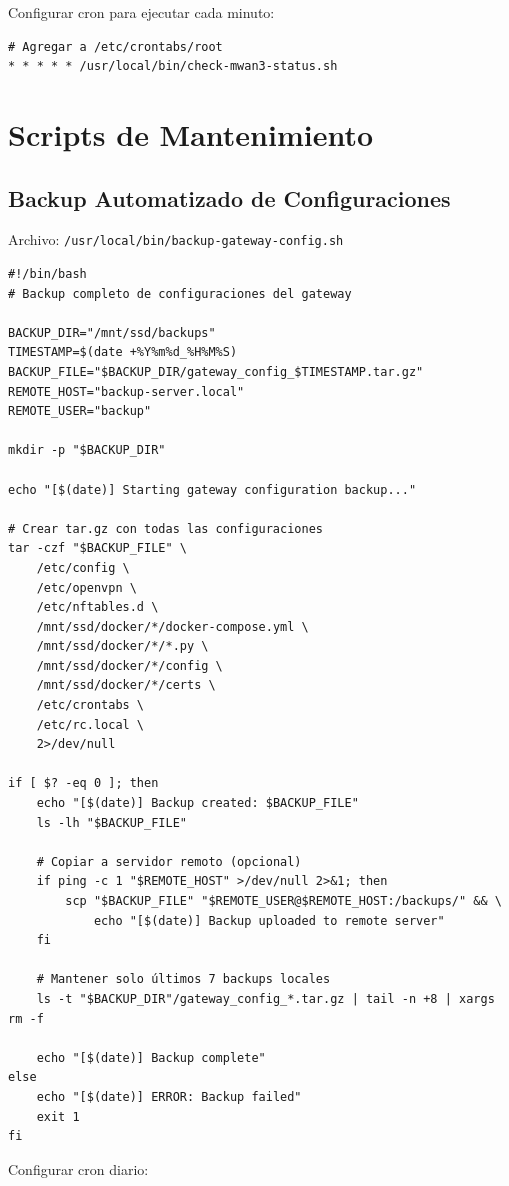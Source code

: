 Configurar cron para ejecutar cada minuto:

\begin{verbatim}
# Agregar a /etc/crontabs/root
* * * * * /usr/local/bin/check-mwan3-status.sh
\end{verbatim}

\section{Scripts de Mantenimiento}

\subsection{Backup Automatizado de Configuraciones}

Archivo: \texttt{/usr/local/bin/backup-gateway-config.sh}

\begin{verbatim}
#!/bin/bash
# Backup completo de configuraciones del gateway

BACKUP_DIR="/mnt/ssd/backups"
TIMESTAMP=$(date +%Y%m%d_%H%M%S)
BACKUP_FILE="$BACKUP_DIR/gateway_config_$TIMESTAMP.tar.gz"
REMOTE_HOST="backup-server.local"
REMOTE_USER="backup"

mkdir -p "$BACKUP_DIR"

echo "[$(date)] Starting gateway configuration backup..."

# Crear tar.gz con todas las configuraciones
tar -czf "$BACKUP_FILE" \
    /etc/config \
    /etc/openvpn \
    /etc/nftables.d \
    /mnt/ssd/docker/*/docker-compose.yml \
    /mnt/ssd/docker/*/*.py \
    /mnt/ssd/docker/*/config \
    /mnt/ssd/docker/*/certs \
    /etc/crontabs \
    /etc/rc.local \
    2>/dev/null

if [ $? -eq 0 ]; then
    echo "[$(date)] Backup created: $BACKUP_FILE"
    ls -lh "$BACKUP_FILE"
    
    # Copiar a servidor remoto (opcional)
    if ping -c 1 "$REMOTE_HOST" >/dev/null 2>&1; then
        scp "$BACKUP_FILE" "$REMOTE_USER@$REMOTE_HOST:/backups/" && \
            echo "[$(date)] Backup uploaded to remote server"
    fi
    
    # Mantener solo últimos 7 backups locales
    ls -t "$BACKUP_DIR"/gateway_config_*.tar.gz | tail -n +8 | xargs rm -f
    
    echo "[$(date)] Backup complete"
else
    echo "[$(date)] ERROR: Backup failed"
    exit 1
fi
\end{verbatim}

Configurar cron diario:

